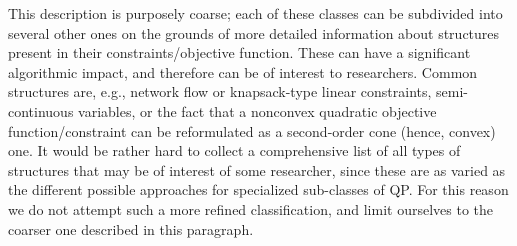 %
This description is purposely coarse; each of these classes can be subdivided into several other ones on the grounds of more detailed information about structures present in their constraints/objective function. These can have a significant algorithmic impact, and therefore can be of interest to researchers. Common structures are, e.g., network flow or knapsack-type linear constraints, semi-continuous variables, or the fact that a nonconvex quadratic objective function/constraint can be reformulated as a second-order cone (hence, convex) one. It would be rather hard to collect a comprehensive list of all types of structures that may be of interest of some researcher, since these are as varied as the different possible approaches for specialized sub-classes of QP. For this reason we do not attempt such a more refined classification, and limit ourselves to the coarser one described in this paragraph.

